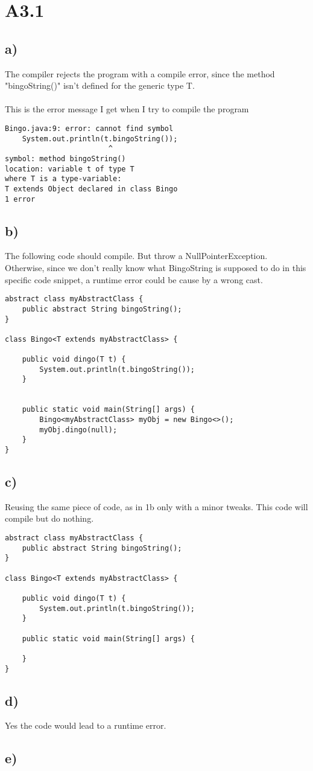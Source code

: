 \section{A3.1}

\subsection{a)}
The compiler rejects the program with a compile error, since the method
"bingoString()" isn't defined for the generic type T.
\\
\\
This is the error message I get when I try to compile the program
\begin{verbatim}
Bingo.java:9: error: cannot find symbol
    System.out.println(t.bingoString());
                        ^
symbol: method bingoString()
location: variable t of type T
where T is a type-variable:
T extends Object declared in class Bingo
1 error

\end{verbatim}

\subsection{b)}
The following code should compile. But throw a NullPointerException. Otherwise, since we don't
really know what BingoString is supposed to do in this specific code snippet, a runtime error could
be cause by a wrong cast.

\begin{verbatim}
abstract class myAbstractClass {
    public abstract String bingoString();
}

class Bingo<T extends myAbstractClass> {

    public void dingo(T t) {
        System.out.println(t.bingoString());
    }


    public static void main(String[] args) {
        Bingo<myAbstractClass> myObj = new Bingo<>();
        myObj.dingo(null);
    }
}
\end{verbatim}

\subsection{c)}
Reusing the same piece of code, as in 1b only with a minor tweaks. This code will compile but do nothing.
\begin{verbatim}
abstract class myAbstractClass {
    public abstract String bingoString();
}

class Bingo<T extends myAbstractClass> {

    public void dingo(T t) {
        System.out.println(t.bingoString());
    }

    public static void main(String[] args) {
        
    }
}
\end{verbatim}

\subsection{d)}
Yes the code would lead to a runtime error.

\subsection{e)}


